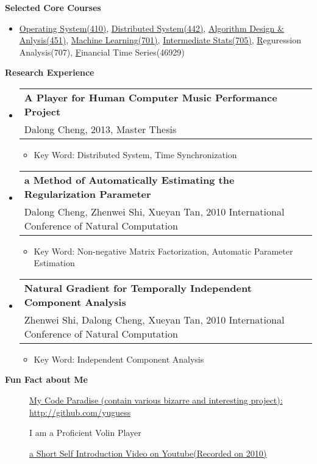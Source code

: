 \documentclass[letterpaper,11pt]{article}
\makeatletter
\newcommand{\resitem}[1]{\item #1 \vspace{-2pt}}
\newcommand{\resheading}[1]{{\large \colorbox{mygrey}{\begin{minipage}{\textwidth}{\textbf{#1 \vphantom{p\^{E}}}}\end{minipage}}}}
\newcommand{\ressubheading}[4]{
\begin{tabular*}{6.5in}{l@{\extracolsep{\fill}}r}
		\textbf{#1} & #2 \\
		{#3}{} & \textit{#4} \\
\end{tabular*}\vspace{-6pt}}
\makeatother
\begin{document}
\resheading{{Selected Core Courses}}
  \begin{itemize}
		\item{\small \href{http://www.cs.cmu.edu/~410/}{Operating System(410)}, 
    \href{http://www.cs.cmu.edu/~dga/15-440/F12/}{Distributed System(442)}, 
    \href{http://www.cs.cmu.edu/~./15451/}{Algorithm Design \& Anlysis(451)}, 
    \href{http://www.cs.cmu.edu/~epxing/Class/10701/}{Machine Learning(701)}, 
    \href{http://www.stat.cmu.edu/~larry/=stat705/}{Intermediate Stats(705)},
    \href{}Reguression Analysis(707),
    \href{}Financial Time Series(46929)}
	\end{itemize}
\resheading{Research Experience}
  \begin{itemize}

  \item 
		\ressubheading{A Player for Human Computer Music 
    Performance Project}{}{Dalong Cheng, 2013, Master Thesis}{}
    { \footnotesize
      \begin{itemize}
        \resitem{Key Word: Distributed System, Time Synchronization}
      \end{itemize}
    }
	
	\item
		\ressubheading{a Method of Automatically Estimating the 
    Regularization Parameter}{}
    {Dalong Cheng, Zhenwei Shi, Xueyan Tan, 
    2010 International Conference of Natural Computation}{}
    { \footnotesize
      \begin{itemize}
      \resitem{Key Word: Non-negative Matrix Factorization, 
      Automatic Parameter Estimation}
      \end{itemize}
    }

		\item 
			\ressubheading{Natural Gradient for Temporally Independent Component Analysis}{}{Zhenwei Shi, Dalong Cheng, Xueyan Tan, 2010 International Conference of Natural Computation}{}
			{ \footnotesize
				\begin{itemize}
					\resitem{Key Word: Independent Component Analysis}
				\end{itemize}
			}

	\end{itemize}  %

\resheading{{Fun Fact about Me}}
	\begin{description}
    \item[] {\href{http://github.com/yuguess}
    {My Code Paradise 
    (contain various bizarre and interesting project):
    http://github.com/yuguess}}

    \item[] {I am a Proficient Volin Player}

    \item[] {\href{http://www.youtube.com/watch?v=zGBpT7A_nYM}{a Short Self Introduction Video on Youtube(Recorded on 2010)}}
  \end{description}
\end{document}
